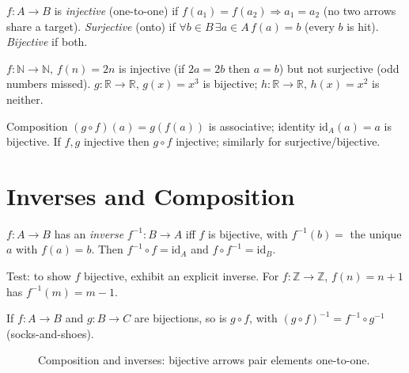 \begin{definition}
$f:A\to B$ is \emph{injective} (one-to-one) if $f(a_1)=f(a_2)\Rightarrow a_1=a_2$ (no two arrows share a target). \emph{Surjective} (onto) if $\forall b\in B\,\exists a\in A\,f(a)=b$ (every $b$ is hit). \emph{Bijective} if both.
\end{definition}

\begin{example}
$f:\mathbb{N}\to\mathbb{N},\,f(n)=2n$ is injective (if $2a=2b$ then $a=b$) but not surjective (odd numbers missed). $g:\mathbb{R}\to\mathbb{R},\,g(x)=x^3$ is bijective; $h:\mathbb{R}\to\mathbb{R},\,h(x)=x^2$ is neither.
\end{example}

Composition $(g\circ f)(a)=g(f(a))$ is associative; identity $\mathrm{id}_A(a)=a$ is bijective. If $f,g$ injective then $g\circ f$ injective; similarly for surjective/bijective.

\section{Inverses and Composition}
\label{sec:inverses}
$f:A\to B$ has an \emph{inverse} $f^{-1}:B\to A$ iff $f$ is bijective, with $f^{-1}(b)=$ the unique $a$ with $f(a)=b$. Then $f^{-1}\circ f=\mathrm{id}_A$ and $f\circ f^{-1}=\mathrm{id}_B$.

Test: to show $f$ bijective, exhibit an explicit inverse. For $f:\mathbb{Z}\to\mathbb{Z}$, $f(n)=n+1$ has $f^{-1}(m)=m-1$.

\begin{lemma}
If $f:A\to B$ and $g:B\to C$ are bijections, so is $g\circ f$, with $(g\circ f)^{-1}=f^{-1}\circ g^{-1}$ (socks-and-shoes).
\end{lemma}

\begin{figure}[h]\centering
{}
\caption{Composition and inverses: bijective arrows pair elements one-to-one.}
\label{fig:composition-inverse}
\end{figure}


